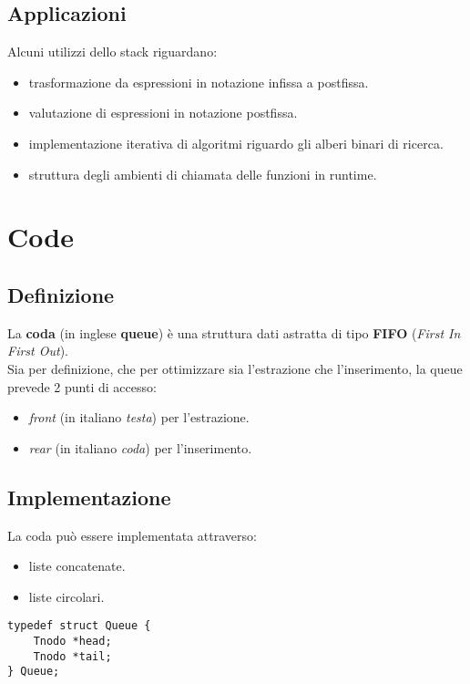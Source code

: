 \subsection{Applicazioni}
Alcuni utilizzi dello stack riguardano:
\begin{itemize}[noitemsep]
	\item trasformazione da espressioni in notazione infissa a postfissa.
	\item valutazione di espressioni in notazione postfissa.
	\item implementazione iterativa di algoritmi riguardo gli alberi binari di ricerca.
	\item struttura degli ambienti di chiamata delle funzioni in runtime.
\end{itemize}

\section{Code}
\subsection{Definizione}
La \textbf{coda} (in inglese \textbf{queue}) è una struttura dati astratta di tipo \textbf{FIFO} (\textit{First In First Out}).\\
Sia per definizione, che per ottimizzare sia l'estrazione che l'inserimento, la queue prevede 2 punti di accesso:
\begin{itemize}[noitemsep, nolistsep]
	\item \textit{front} (in italiano \textit{testa}) per l'estrazione.
	\item \textit{rear} (in italiano \textit{coda}) per l'inserimento.
\end{itemize}

\subsection{Implementazione}
La coda può essere implementata attraverso:
\begin{itemize}[noitemsep]
	\item liste concatenate.
	\item liste circolari.
\end{itemize}
\begin{lstlisting}[title={Implementazione di una coda attraverso liste concatenate}]
typedef struct Queue {
    Tnodo *head;
    Tnodo *tail;
} Queue;
\end{lstlisting}

